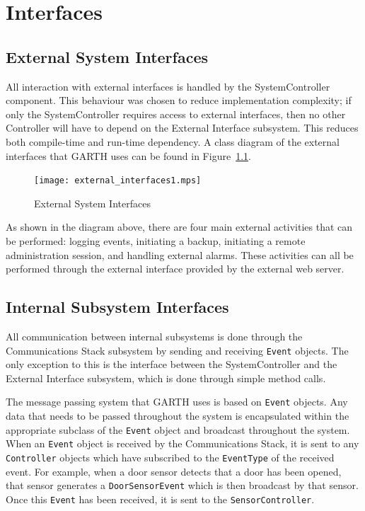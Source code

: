 \documentclass{report}
\begin{document}
\chapter{Interfaces} %
\label{ch:interfaces}

\section{External System Interfaces}

All interaction with external interfaces is handled by the
SystemController component. This behaviour was chosen to reduce
implementation complexity; if only the SystemController requires
access to external interfaces, then no other Controller will have to
depend on the External Interface subsystem.  This reduces both
compile-time and run-time dependency. A class diagram of the external
interfaces that GARTH uses can be found in
Figure~\ref{fig:external_interfaces}.

\begin{figure}[hp]
    \centering
        \caption{External System Interfaces}
        \scriptsize
        \setlength{\unitlength}{2.0em}
        \texttt{[image: external\_interfaces1.mps]}
        \normalsize
    \label{fig:external_interfaces}
\end{figure}

As shown in the diagram above, there are four main external activities
that can be performed: logging events, initiating a backup, initiating
a remote administration session, and handling external alarms. These
activities can all be performed through the external interface
provided by the external web server.

\section{Internal Subsystem Interfaces}
\label{sec:internal_subsystem_interfaces}

All communication between internal subsystems is done through the
Communications Stack subsystem by sending and receiving \texttt{Event}
objects. The only exception to this is the interface between the
SystemController and the External Interface subsystem, which is done
through simple method calls.

The message passing system that GARTH uses is based on \texttt{Event}
objects. Any data that needs to be passed throughout the system is
encapsulated within the appropriate subclass of the \texttt{Event}
object and broadcast throughout the system. When an \texttt{Event}
object is received by the Communications Stack, it is sent to any
\texttt{Controller} objects which have subscribed to the
\texttt{EventType} of the received event. For example, when a door
sensor detects that a door has been opened, that sensor generates a
\texttt{DoorSensorEvent} which is then broadcast by that sensor. Once
this \texttt{Event} has been received, it is sent to the
\texttt{SensorController}.
\end{document}
